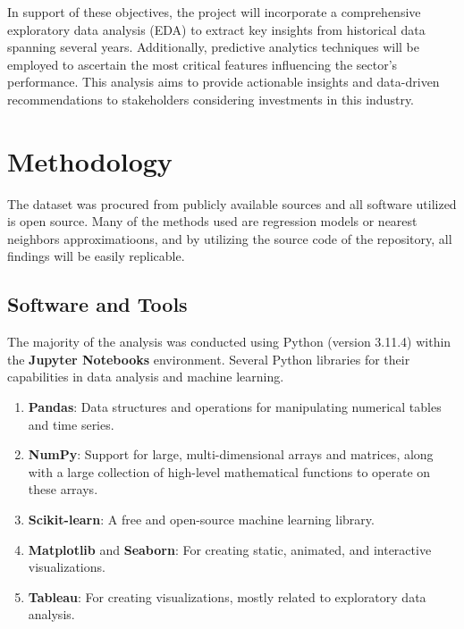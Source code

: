 \documentclass{article}
\theoremstyle{mytheoremstyle}
\theoremstyle{mytheoremstyle}
\theoremstyle{myproblemstyle}
\begin{document}
In support of these objectives, the project will incorporate a comprehensive exploratory data analysis (EDA) to extract key insights from historical data spanning several years. Additionally, predictive analytics techniques will be employed to ascertain the most critical features influencing the sector’s performance. This analysis aims to provide actionable insights and data-driven recommendations to stakeholders considering investments in this industry.


\section{Methodology}

The dataset was procured from publicly available sources and all software utilized is open source. Many of the methods used are regression models or nearest neighbors approximatioons, and by utilizing the source code of the repository, all findings will be easily replicable.

\subsection{Software and Tools}

The majority of the analysis was conducted using Python (version 3.11.4) within the \textbf{Jupyter Notebooks} environment. Several Python libraries for their capabilities in data analysis and machine learning. 

\begin{enumerate}
    \item \textbf{Pandas}: Data structures and operations for manipulating numerical tables and time series.
    \item \textbf{NumPy}: Support for large, multi-dimensional arrays and matrices, along with a large collection of high-level mathematical functions to operate on these arrays.
    \item \textbf{Scikit-learn}: A free and open-source machine learning library. 
    \item \textbf{Matplotlib} and \textbf{Seaborn}: For creating static, animated, and interactive visualizations.
    \item \textbf{Tableau}: For creating visualizations, mostly related to exploratory data analysis.
\end{enumerate}
\end{document}
